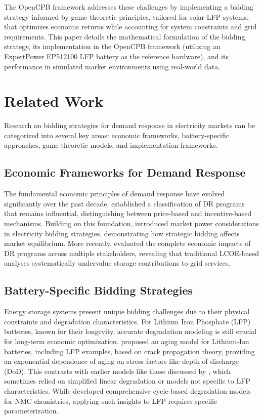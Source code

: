 \documentclass[11pt,a4paper]{article}
\begin{document}
The OpenCPB framework addresses these challenges by implementing a bidding strategy informed by game-theoretic principles, tailored for solar-LFP systems, that optimizes economic returns while accounting for system constraints and grid requirements. This paper details the mathematical formulation of the bidding strategy, its implementation in the OpenCPB framework (utilizing an ExpertPower EP512100 LFP battery as the reference hardware), and its performance in simulated market environments using real-world data.

\section{Related Work}
Research on bidding strategies for demand response in electricity markets can be categorized into several key areas: economic frameworks, battery-specific approaches, game-theoretic models, and implementation frameworks.

\subsection{Economic Frameworks for Demand Response}
The fundamental economic principles of demand response have evolved significantly over the past decade. \citet{Siano2014} established a classification of DR programs that remains influential, distinguishing between price-based and incentive-based mechanisms. Building on this foundation, \citet{Oren2001} introduced market power considerations in electricity bidding strategies, demonstrating how strategic bidding affects market equilibrium. More recently, \citet{Paterakis2017} evaluated the complete economic impacts of DR programs across multiple stakeholders, revealing that traditional LCOE-based analyses systematically undervalue storage contributions to grid services.

\subsection{Battery-Specific Bidding Strategies}
Energy storage systems present unique bidding challenges due to their physical constraints and degradation characteristics. For Lithium Iron Phosphate (LFP) batteries, known for their longevity, accurate degradation modeling is still crucial for long-term economic optimization. \citet{Millner2010} proposed an aging model for Lithium-Ion batteries, including LFP examples, based on crack propagation theory, providing an exponential dependence of aging on stress factors like depth of discharge (DoD). This contrasts with earlier models like those discussed by \citet{He2016}, which sometimes relied on simplified linear degradation or models not specific to LFP characteristics. While \citet{Xu2018} developed comprehensive cycle-based degradation models for NMC chemistries, applying such insights to LFP requires specific parameterization.
\end{document}

